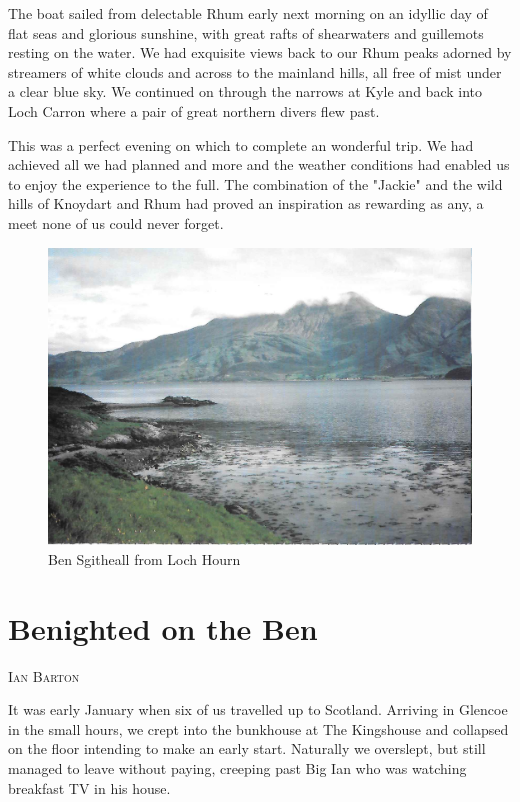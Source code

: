 \documentclass[a5paper,openany,font 10pt]{scrbook}
\makeatletter
\newcommand{\chapterauthor}[1]{%
{\parindent0pt\vspace*{-5pt}%
\linespread{1.1}\large\scshape#1%
\par\nobreak\vspace*{35pt}}
\@afterheading%
}
\makeatother
\begin{document}
The boat sailed from delectable Rhum early next morning on
an idyllic day of flat seas and glorious sunshine, with great
rafts of shearwaters and guillemots resting on the water. We had
exquisite views back to our Rhum peaks adorned by streamers of
white clouds and across to  the mainland hills, all free of mist
under a clear blue sky. We continued on through the narrows at
Kyle and back into Loch Carron where a pair of great northern
divers flew past.

This was a perfect evening on which to complete an wonderful
trip. We had achieved all we had planned and more and the weather
conditions had enabled us to enjoy the experience to the full.
The combination of the "Jackie" and the wild hills of Knoydart
and Rhum had proved an inspiration as rewarding as any, a meet
none of us could never forget.
\begin{figure}[htb]
\centering
\includegraphics[width=.9\linewidth]{./images/Ben_Sgitheall_from_Loch_Hourn.jpg}
\caption{\label{fig:org5312618}
Ben Sgitheall from Loch Hourn}
\end{figure}

\chapter{Benighted on the Ben}
\label{sec:org7a1677d}
\chapterauthor{Ian Barton}

It was early January when six of us travelled up to
Scotland. Arriving in Glencoe in the small hours, we crept into the
bunkhouse at The Kingshouse and collapsed on the floor intending to
make an early start. Naturally we overslept, but still managed to
leave without paying, creeping past Big Ian who was watching breakfast
TV in his house.
\end{document}
